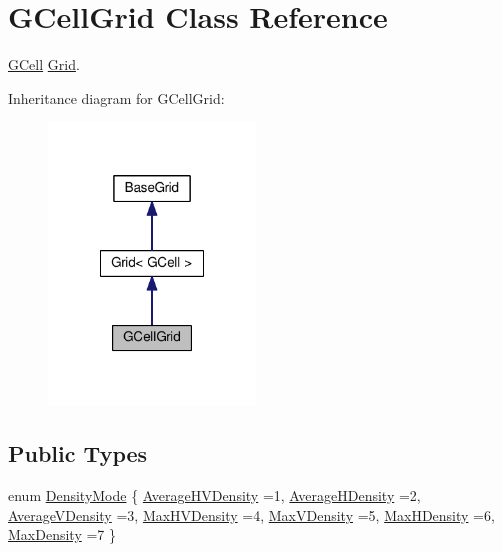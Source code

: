 \hypertarget{classKatabatic_1_1GCellGrid}{}\section{G\+Cell\+Grid Class Reference}
\label{classKatabatic_1_1GCellGrid}


\hyperlink{classKatabatic_1_1GCell}{G\+Cell} \hyperlink{classKatabatic_1_1Grid}{Grid}.  




Inheritance diagram for G\+Cell\+Grid\+:\nopagebreak
\begin{figure}[H]
\begin{center}
\leavevmode
\includegraphics[width=156pt]{classKatabatic_1_1GCellGrid__inherit__graph}
\end{center}
\end{figure}
\subsection*{Public Types}
\begin{DoxyCompactItemize}
\item 
enum \hyperlink{classKatabatic_1_1GCellGrid_a07884f5e1af410e98208fed76a2b40fe}{Density\+Mode} \{ \newline
\hyperlink{classKatabatic_1_1GCellGrid_a07884f5e1af410e98208fed76a2b40fead15bf3e5b63f398d76d717a088acd310}{Average\+H\+V\+Density} =1, 
\newline
\hyperlink{classKatabatic_1_1GCellGrid_a07884f5e1af410e98208fed76a2b40feaec0ad06385eae8d1e2dee4f3c9f9f4ed}{Average\+H\+Density} =2, 
\newline
\hyperlink{classKatabatic_1_1GCellGrid_a07884f5e1af410e98208fed76a2b40fead1a1d89017d10aeb63d1c05b6fb650dd}{Average\+V\+Density} =3, 
\newline
\hyperlink{classKatabatic_1_1GCellGrid_a07884f5e1af410e98208fed76a2b40fea8265e053af0708a508ecbce86d1a8165}{Max\+H\+V\+Density} =4, 
\newline
\hyperlink{classKatabatic_1_1GCellGrid_a07884f5e1af410e98208fed76a2b40fea5f0a89ca367ef98550eaa86c1e32c873}{Max\+V\+Density} =5, 
\newline
\hyperlink{classKatabatic_1_1GCellGrid_a07884f5e1af410e98208fed76a2b40fea2a6d29b012cc89026c3c0061f87a4f03}{Max\+H\+Density} =6, 
\newline
\hyperlink{classKatabatic_1_1GCellGrid_a07884f5e1af410e98208fed76a2b40fea90a2f4a4ee8558de9f99458ddeab852c}{Max\+Density} =7
 \}
\end{DoxyCompactItemize}
